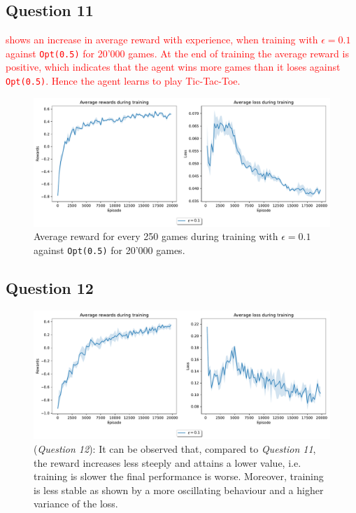 \documentclass[10pt]{IEEEtran}
\begin{document}
\subsection*{Question 11}
\textcolor{red}{ shows an increase in average reward with experience, when training with $\epsilon = 0.1$ against \texttt{Opt(0.5)} for 20'000 games. At the end of training the average reward is positive, which indicates that the agent wins more games than it loses \textcolor{red}{against \texttt{Opt(0.5)}}. Hence the agent learns to play Tic-Tac-Toe.}

\begin{figure}[h]
    \centering
    \includegraphics[width = \linewidth]{code/figures/rewards_epsilon_exploration_Q11.pdf}
    \caption{Average reward for every 250 games during training with $\epsilon = 0.1$ against \texttt{Opt(0.5)} for 20'000 games.}
    \label{plot_question11}
\end{figure}

\subsection*{Question 12}
\begin{figure}[h]
    \centering
    \includegraphics[width = \linewidth]{code/figures/rewards_epsilon_exploration_Q12.pdf}
    \caption{(\emph{Question 12}): It can be observed that, compared to \emph{Question 11}, the reward increases less steeply and attains a lower value, i.e. training is slower the final performance is worse. Moreover, training is less stable as shown by a more oscillating behaviour and a higher variance of the loss.}
    \label{plot_question12}
\end{figure}
\end{document}
